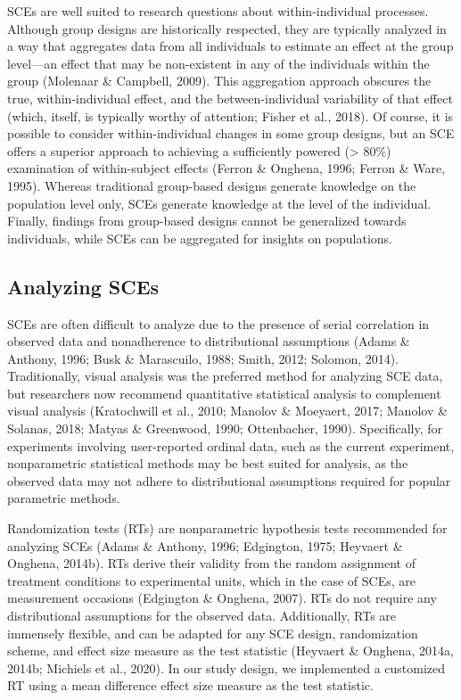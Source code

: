 \documentclass{article}
\begin{document}
SCEs are well suited to research questions about within-individual processes. Although group designs are historically respected, they are typically analyzed in a way that aggregates data from all individuals to estimate an effect at the group level—an effect that may be non-existent in any of the individuals within the group (Molenaar \& Campbell, 2009). This aggregation approach obscures the true, within-individual effect, and the between-individual variability of that effect (which, itself, is typically worthy of attention; Fisher et al., 2018). Of course, it is possible to consider within-individual changes in some group designs, but an SCE offers a superior approach to achieving a sufficiently powered (> 80\%) examination of within-subject effects (Ferron \& Onghena, 1996; Ferron \& Ware, 1995). Whereas traditional group-based designs generate knowledge on the population level only, SCEs generate knowledge at the level of the individual. Finally, findings from group-based designs cannot be generalized towards individuals, while SCEs can be aggregated for insights on populations.

\subsection{Analyzing SCEs}

SCEs are often difficult to analyze due to the presence of serial correlation in observed data and nonadherence to distributional assumptions (Adams \& Anthony, 1996; Busk \& Marascuilo, 1988; Smith, 2012; Solomon, 2014). Traditionally, visual analysis was the preferred method for analyzing SCE data, but researchers now recommend quantitative statistical analysis to complement visual analysis (Kratochwill et al., 2010; Manolov \& Moeyaert, 2017; Manolov \& Solanas, 2018; Matyas \& Greenwood, 1990; Ottenbacher, 1990). Specifically, for experiments involving user-reported ordinal data, such as the current experiment, nonparametric statistical methods may be best suited for analysis, as the observed data may not adhere to distributional assumptions required for popular parametric methods. 

Randomization tests (RTs) are nonparametric hypothesis tests recommended for analyzing SCEs (Adams \& Anthony, 1996; Edgington, 1975; Heyvaert \& Onghena, 2014b). RTs derive their validity from the random assignment of treatment conditions to experimental units, which in the case of SCEs, are measurement occasions (Edgington \& Onghena, 2007). RTs do not require any distributional assumptions for the observed data. Additionally, RTs are immensely flexible, and can be adapted for any SCE design, randomization scheme, and effect size measure as the test statistic (Heyvaert \& Onghena, 2014a, 2014b; Michiels et al., 2020). In our study design, we implemented a customized RT using a mean difference effect size measure as the test statistic. 
\end{document}
